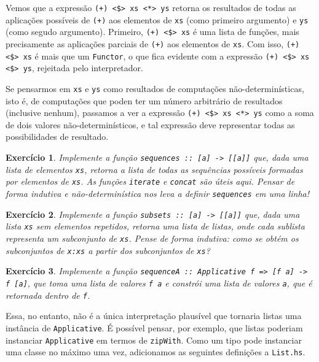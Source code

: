 \documentclass[a4paper]{article}
\newtheorem{exercicio}{Exercício}
\begin{document}
Vemos que a expressão \texttt{(+) <\$> xs <*> ys} retorna os resultados de todas as aplicações possíveis de \texttt{(+)} aos elementos de \texttt{xs} (como primeiro argumento) e \texttt{ys} (como segudo argumento).
Primeiro, \mbox{\texttt{(+) <\$> xs}} é uma lista de funções, mais precisamente as aplicações parciais de \texttt{(+)} aos elementos de \texttt{xs}.
Com isso, \mbox{\texttt{(+) <\$> xs}} é mais que um \texttt{Functor}, o que fica evidente com a expressão \texttt{(+) <\$> xs <\$> ys}, rejeitada pelo interpretador.

Se pensarmos em \texttt{xs} e \texttt{ys} como resultados de computações não-determinísticas, isto é, de computações que poden ter um número arbitrário de resultados (inclusive nenhum), passamos a ver a expressão \texttt{(+) <\$> xs <*> ys} como a soma de dois valores não-determinísticos, e tal expressão deve representar todas as possibilidades de resultado.

\begin{exercicio}
	Implemente a função \emph{\texttt{sequences :: [a] -> [[a]]}} que, dada uma lista de elementos \emph{\texttt{xs}}, retorna a lista de todas as sequências possíveis formadas por elementos de \emph{\texttt{xs}}.
	As funções \emph{\texttt{iterate}} e \emph{\texttt{concat}} são úteis aqui.
	Pensar de forma indutiva e não-determinística nos leva a definir \emph{\texttt{sequences}} em uma linha!
\end{exercicio}

\begin{exercicio} \label{exercicio:subsets}
	Implemente a função \emph{\texttt{subsets :: [a] -> [[a]]}} que, dada uma lista \emph{\texttt{xs}} sem elementos repetidos, retorna uma lista de listas, onde cada sublista representa um subconjunto de \emph{\texttt{xs}}.
	Pense de forma indutiva: como se obtém os subconjuntos de \emph{\texttt{x:xs}} a partir dos subconjuntos de \emph{\texttt{xs}}?
\end{exercicio}

\begin{exercicio}	\label{exercicio:sequenceA}
	Implemente a função \emph{\texttt{sequenceA :: Applicative f => [f a] -> f [a]}}, que toma uma lista de valores \emph{\texttt{f a}} e constrói uma lista de valores \emph{\texttt{a}}, que é retornada dentro de \emph{\texttt{f}}.
\end{exercicio}

Essa, no entanto, não é a única interpretação plausível que tornaria listas uma instância de \texttt{Applicative}.
É possível pensar, por exemplo, que listas poderiam instanciar \texttt{Applicative} em termos de \texttt{zipWith}.
Como um tipo pode instanciar uma classe no máximo uma vez, adicionamos as seguintes definições a \texttt{List.hs}.
\end{document}

